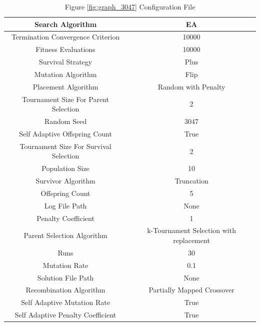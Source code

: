 \documentclass{standalone}
\begin{document}
\begin{table}[!htb]
	\centering
	\caption{Figure \ref{fig:graph_3047} Configuration File}
	\label{tab:graph_3047}
	\begin{tabular}{| c | c |}
		\hline
		Search Algorithm		& EA		 \\
		\hline
		Termination Convergence Criterion		& 10000		 \\
		\hline
		Fitness Evaluations		& 10000		 \\
		\hline
		Survival Strategy		& Plus		 \\
		\hline
		Mutation Algorithm		& Flip		 \\
		\hline
		Placement Algorithm		& Random with Penalty		 \\
		\hline
		Tournament Size For Parent Selection		& 2		 \\
		\hline
		Random Seed		& 3047		 \\
		\hline
		Self Adaptive Offspring Count		& True		 \\
		\hline
		Tournament Size For Survival Selection		& 2		 \\
		\hline
		Population Size		& 10		 \\
		\hline
		Survivor Algorithm		& Truncation		 \\
		\hline
		Offspring Count		& 5		 \\
		\hline
		Log File Path		& None		 \\
		\hline
		Penalty Coefficient		& 1		 \\
		\hline
		Parent Selection Algorithm		& k-Tournament Selection with replacement		 \\
		\hline
		Runs		& 30		 \\
		\hline
		Mutation Rate		& 0.1		 \\
		\hline
		Solution File Path		& None		 \\
		\hline
		Recombination Algorithm		& Partially Mapped Crossover		 \\
		\hline
		Self Adaptive Mutation Rate		& True		 \\
		\hline
		Self Adaptive Penalty Coefficient		& True		 \\
		\hline
	\end{tabular}
\end{table}
\end{document}
